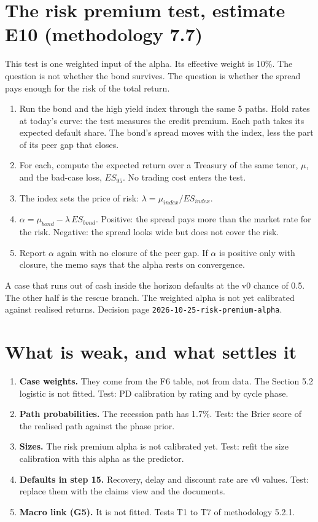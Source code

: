 \documentclass[10pt,a4paper]{article}
\begin{document}
\section{The risk premium test, estimate E10 (methodology 7.7)}
This test is one weighted input of the alpha. Its effective weight is 10\%.
The question is not whether the bond survives. The question is whether the spread pays enough for the risk of the total return.
\begin{enumerate}
\item Run the bond and the high yield index through the same 5 paths. Hold rates at today's curve: the test measures the credit premium. Each path takes its expected default share. The bond's spread moves with the index, less the part of its peer gap that closes.
\item For each, compute the expected return over a Treasury of the same tenor, $\mu$, and the bad-case loss, $ES_{95}$. No trading cost enters the test.
\item The index sets the price of risk: $\lambda = \mu_{index}/ES_{index}$.
\item $\alpha = \mu_{bond} - \lambda\,ES_{bond}$. Positive: the spread pays more than the market rate for the risk. Negative: the spread looks wide but does not cover the risk.
\item Report $\alpha$ again with no closure of the peer gap. If $\alpha$ is positive only with closure, the memo says that the alpha rests on convergence.
\end{enumerate}
A case that runs out of cash inside the horizon defaults at the v0 chance of 0.5. The other half is the rescue branch. The weighted alpha is not yet calibrated against realised returns. Decision page \texttt{2026-10-25-risk-premium-alpha}.

\section{What is weak, and what settles it}
\begin{enumerate}
\item \textbf{Case weights.} They come from the F6 table, not from data. The Section 5.2 logistic is not fitted. Test: PD calibration by rating and by cycle phase.
\item \textbf{Path probabilities.} The recession path has 1.7\%. Test: the Brier score of the realised path against the phase prior.
\item \textbf{Sizes.} The risk premium alpha is not calibrated yet. Test: refit the size calibration with this alpha as the predictor.
\item \textbf{Defaults in step 15.} Recovery, delay and discount rate are v0 values. Test: replace them with the claims view and the documents.
\item \textbf{Macro link (G5).} It is not fitted. Tests T1 to T7 of methodology 5.2.1.
\end{enumerate}
\end{document}
